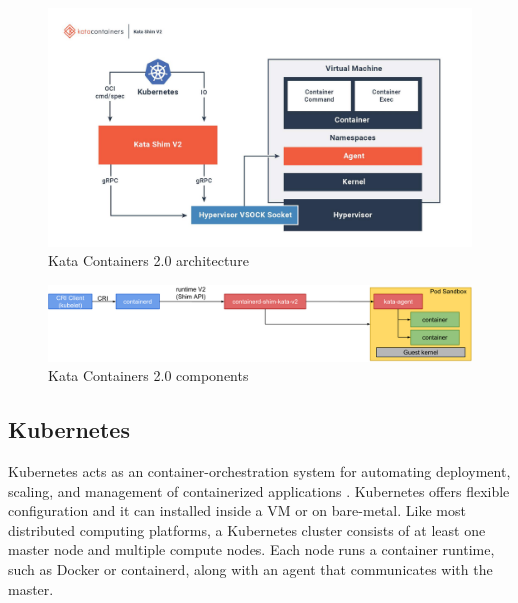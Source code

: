 \begin{figure}[ht]
  \begin{center}
    \includegraphics[width=13.5cm]{images/KataContainersArchitecture.jpg}
    \caption{Kata Containers 2.0 architecture \cite{KataContainers}}
    \label{fig:KataContainersArchitecture}
  \end{center}
\end{figure}

\begin{figure}[ht]
  \begin{center}
    \includegraphics[width=13.5cm]{images/KataContainersComponents.png}
    \caption{Kata Containers 2.0 components \cite{KataContainersArchitecture}}
    \label{fig:KataContainersComponents}
  \end{center}
\end{figure}

\subsection{Kubernetes}

Kubernetes acts as an container-orchestration system for automating deployment, scaling, and management of containerized applications \cite{Kubernetes}. Kubernetes offers flexible configuration and it can installed inside a VM or on bare-metal. Like most distributed computing platforms, a Kubernetes cluster consists of at least one master node and multiple compute nodes. Each node runs a container runtime, such as Docker or containerd, along with an agent that communicates with the master.


